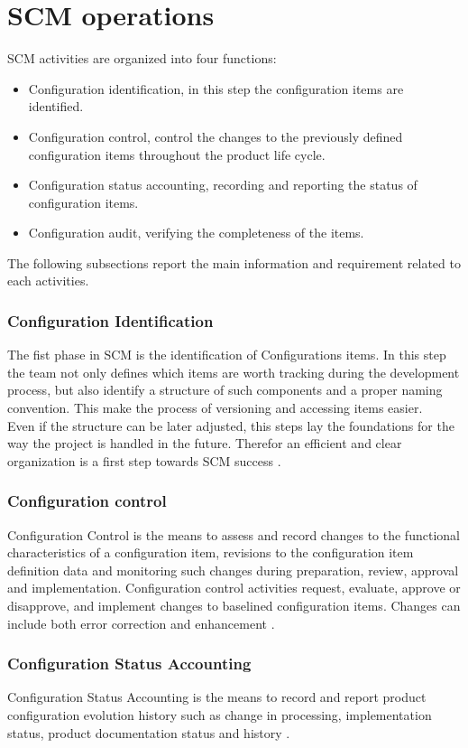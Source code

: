\documentclass[../main.tex]{subfiles}
\begin{document}
\section{SCM operations}
\gls{SCM} activities are organized into four functions:
\begin{itemize}
    \item Configuration identification, in this step the configuration items are identified.
    \item Configuration control, control the changes to the previously defined configuration items throughout the product life cycle.
    \item Configuration status accounting, recording and reporting the status of configuration items.
    \item Configuration audit, verifying the completeness of the items. 
\end{itemize}
The following subsections report the main information and requirement related to each activities.
\subsubsection{Configuration Identification}
The fist phase in SCM is the identification of Configurations items. In this step the team not only defines which items are worth tracking during the development process, but also identify a structure of such components and a proper naming convention. This make the process of versioning and accessing items easier.\\
Even if the structure can be later adjusted, this steps lay the foundations for the way the project is handled in the future. Therefor an efficient and clear organization is a first step towards \gls{SCM} success \cite{ieestandard}.
\subsubsection{Configuration control}
Configuration Control is the means to assess and record changes to the functional characteristics of a configuration item, revisions to the configuration item definition data and monitoring such changes during preparation, review, approval and implementation. Configuration control activities request, evaluate, approve or disapprove, and implement changes to baselined configuration items. Changes can include both error correction and enhancement \cite{ieestandard}.
\subsubsection{Configuration Status Accounting}
Configuration Status Accounting is the means to record and report product configuration evolution history such as change in processing, implementation status, product documentation status and history \cite{ieestandard}.
\end{document}
